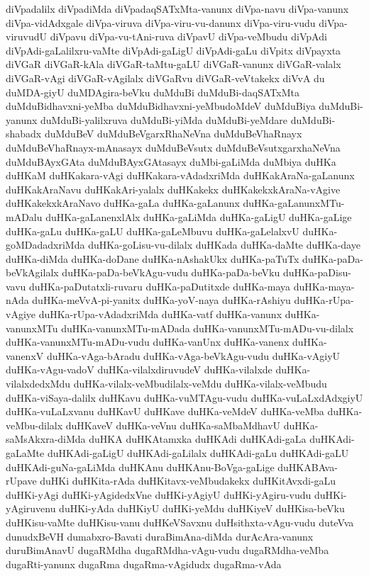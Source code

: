 {diVpadalilx
diVpadiMda
diVpadaqSATxMta-vanunx
diVpa-navu
diVpa-vanunx
diVpa-vidAdxgale
diVpa-viruva
diVpa-viru-vu-danunx
diVpa-viru-vudu
diVpa-viruvudU
diVpavu
diVpa-vu-tAni-ruva
diVpavU
diVpa-veMbudu
diVpAdi
diVpAdi-gaLalilxru-vaMte
diVpAdi-gaLigU
diVpAdi-gaLu
diVpitx
diVpayxta
diVGaR
diVGaR-kAla
diVGaR-taMtu-gaLU
diVGaR-vanunx
diVGaR-valalx
diVGaR-vAgi
diVGaR-vAgilalx
diVGaRvu
diVGaR-veVtakekx
diVvA
du
duMDA-giyU
duMDAgira-beVku
duMduBi
duMduBi-daqSATxMta
duMduBidhavxni-yeMba
duMduBidhavxni-yeMbudoMdeV
duMduBiya
duMduBi-yanunx
duMduBi-yalilxruva
duMduBi-yiMda
duMduBi-yeMdare
duMduBi-shabadx
duMduBeV
duMduBeVgarxRhaNeVna
duMduBeVhaRnayx
duMduBeVhaRnayx-mAnasayx
duMduBeVsutx
duMduBeVsutxgarxhaNeVna
duMduBAyxGAta
duMduBAyxGAtasayx
duMbi-gaLiMda
duMbiya
duHKa
duHKaM
duHKakara-vAgi
duHKakara-vAdadxriMda
duHKakAraNa-gaLanunx
duHKakAraNavu
duHKakAri-yalalx
duHKakekx
duHKakekxkAraNa-vAgive
duHKakekxkAraNavo
duHKa-gaLa
duHKa-gaLanunx
duHKa-gaLanunxMTu-mADalu
duHKa-gaLanenxlAlx
duHKa-gaLiMda
duHKa-gaLigU
duHKa-gaLige
duHKa-gaLu
duHKa-gaLU
duHKa-gaLeMbuvu
duHKa-gaLelalxvU
duHKa-goMDadadxriMda
duHKa-goLisu-vu-dilalx
duHKada
duHKa-daMte
duHKa-daye
duHKa-diMda
duHKa-doDane
duHKa-nAshakUkx
duHKa-paTuTx
duHKa-paDa-beVkAgilalx
duHKa-paDa-beVkAgu-vudu
duHKa-paDa-beVku
duHKa-paDisu-vavu
duHKa-paDutatxli-ruvaru
duHKa-paDutitxde
duHKa-maya
duHKa-maya-nAda
duHKa-meVvA-pi-yanitx
duHKa-yoV-naya
duHKa-rAshiyu
duHKa-rUpa-vAgiye
duHKa-rUpa-vAdadxriMda
duHKa-vatf
duHKa-vanunx
duHKa-vanunxMTu
duHKa-vanunxMTu-mADada
duHKa-vanunxMTu-mADu-vu-dilalx
duHKa-vanunxMTu-mADu-vudu
duHKa-vanUnx
duHKa-vanenx
duHKa-vanenxV
duHKa-vAga-bAradu
duHKa-vAga-beVkAgu-vudu
duHKa-vAgiyU
duHKa-vAgu-vadoV
duHKa-vilalxdiruvudeV
duHKa-vilalxde
duHKa-vilalxdedxMdu
duHKa-vilalx-veMbudilalx-veMdu
duHKa-vilalx-veMbudu
duHKa-viSaya-dalilx
duHKavu
duHKa-vuMTAgu-vudu
duHKa-vuLaLxdAdxgiyU
duHKa-vuLaLxvanu
duHKavU
duHKave
duHKa-veMdeV
duHKa-veMba
duHKa-veMbu-dilalx
duHKaveV
duHKa-veVnu
duHKa-saMbaMdhavU
duHKa-saMsAkxra-diMda
duHKA
duHKAtamxka
duHKAdi
duHKAdi-gaLa
duHKAdi-gaLaMte
duHKAdi-gaLigU
duHKAdi-gaLilalx
duHKAdi-gaLu
duHKAdi-gaLU
duHKAdi-guNa-gaLiMda
duHKAnu
duHKAnu-BoVga-gaLige
duHKABAva-rUpave
duHKi
duHKita-rAda
duHKitavx-veMbudakekx
duHKitAvxdi-gaLu
duHKi-yAgi
duHKi-yAgidedxVne
duHKi-yAgiyU
duHKi-yAgiru-vudu
duHKi-yAgiruvenu
duHKi-yAda
duHKiyU
duHKi-yeMdu
duHKiyeV
duHKisa-beVku
duHKisu-vaMte
duHKisu-vanu
duHKeVSavxnu
duHsithxta-vAgu-vudu
duteVva
dunudxBeVH
dumabxro-Bavati
duraBimAna-diMda
durAcAra-vanunx
duruBimAnavU
dugaRMdha
dugaRMdha-vAgu-vudu
dugaRMdha-veMba
dugaRti-yanunx
dugaRma
dugaRma-vAgidudx
dugaRma-vAda
}
